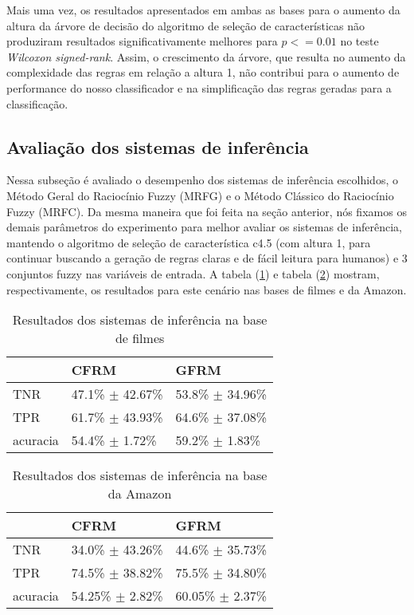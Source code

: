 \documentclass[template.tex]{subfiles}
\begin{document}
Mais uma vez, os resultados apresentados em ambas as bases para o aumento da altura da árvore de decisão do algoritmo de seleção de características não produziram resultados significativamente melhores para $p <= 0.01$ no teste \textit{Wilcoxon signed-rank}. Assim, o crescimento da árvore, que resulta no aumento da complexidade das regras em relação a altura 1, não contribui para o aumento de performance do nosso classificador e na simplificação das regras geradas para a classificação. 

\subsection{Avaliação dos sistemas de inferência}

Nessa subseção é avaliado o desempenho dos sistemas de inferência escolhidos, o Método Geral do Raciocínio Fuzzy (MRFG) e o Método Clássico do Raciocínio Fuzzy (MRFC). Da mesma maneira que foi feita na seção anterior, nós fixamos os demais parâmetros do experimento para melhor avaliar os sistemas de inferência, mantendo o algoritmo de seleção de característica c4.5 (com altura 1, para continuar buscando a geração de regras claras e de fácil leitura para humanos) e 3 conjuntos fuzzy nas variáveis de entrada. A tabela (\ref{table:movies2}) e tabela (\ref{table:amazon2}) mostram, respectivamente, os resultados para este cenário nas bases de filmes e da Amazon.

\begin{table}[!h]
    \begin{tabular}{lll}
 	~         			& CFRM 								& GFRM \\ \hline
    TNR 				& 47.1\% $\pm$ 42.67\%   & 53.8\% $\pm$ 34.96\%    \\
    TPR    			& 61.7\% $\pm$ 43.93\%   & 64.6\% $\pm$ 37.08\%   \\
    acuracia  		& 54.4\% $\pm$ 1.72\%    	& 59.2\% $\pm$ 1.83\%    \\
    \end{tabular}
    \caption{Resultados dos sistemas de inferência na base de filmes}
	\label{table:movies2}
\end{table}

%
%
%

\begin{table}[!h]
    \begin{tabular}{lll}
    ~         			& CFRM 									& GFRM \\ \hline
    TNR 				& 34.0\% $\pm$ 43.26\%    	& 44.6\% $\pm$ 35.73\%    \\
    TPR    			& 74.5\% $\pm$ 38.82\%    	& 75.5\% $\pm$ 34.80\%    \\
    acuracia  		& 54.25\% $\pm$ 2.82\%    	& 60.05\% $\pm$ 2.37\%   \\
    \end{tabular}
    \caption{Resultados dos sistemas de inferência na base da Amazon}
	\label{table:amazon2}
\end{table}
\end{document}
